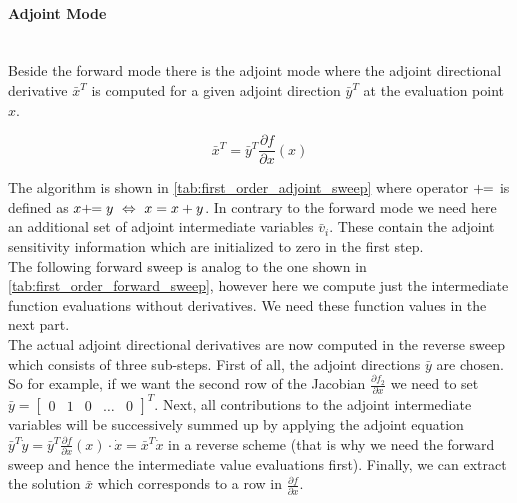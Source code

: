 \documentclass{scrartcl}[12pt, halfparskip]
\numberwithin{equation}{section}
\numberwithin{figure}{section}
\numberwithin{table}{section}
\begin{document}
\paragraph{Adjoint Mode}\mbox{}\\
Beside the forward mode there is the adjoint mode where the adjoint directional derivative $\bar{x}^T$ is computed for a given adjoint direction $\bar{y}^T$ at the evaluation point $x$. 

\begin{equation}
\bar{x}^T = \bar{y}^T \frac{\partial f}{\partial x}(x)
\end{equation}

The algorithm is shown in \cref{tab:first_order_adjoint_sweep} where operator $+ \hspace{-0.12cm} =$ is defined as $x + \hspace{-0.12cm} = y \ \Leftrightarrow \ x = x + y$. In contrary to the forward mode we need here an additional set of adjoint intermediate variables $\bar{v}_i$. These contain the adjoint sensitivity information which are initialized to zero in the first step. \\
The following forward sweep is analog to the one shown in \cref{tab:first_order_forward_sweep}, however here we compute just the intermediate function evaluations without derivatives. We need these function values in the next part. \\
The actual adjoint directional derivatives are now computed in the reverse sweep which consists of three sub-steps. First of all, the adjoint directions $\bar{y}$ are chosen. So for example, if we want the second row of the Jacobian $\frac{\partial f_2}{\partial x}$ we need to set $\bar{y} = \begin{bmatrix}
0 & 1 & 0 & \dots & 0
\end{bmatrix}^T$.
Next, all contributions to the adjoint intermediate variables will be successively summed up by applying the adjoint equation $\bar{y}^T \dot{y} = \bar{y}^T \frac{\partial f}{\partial x}(x) \cdot \dot{x} = \bar{x}^T \dot{x}$ in a reverse scheme (that is why we need the forward sweep and hence the intermediate value evaluations first). Finally, we can extract the solution $\bar{x}$ which corresponds to a row in $\frac{\partial f}{\partial x}$.
\end{document}
